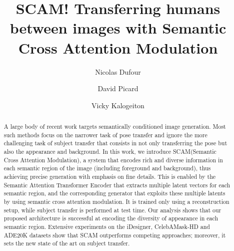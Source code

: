 \documentclass[runningheads]{llncs}
\makeatletter
\newcommand{\mname}{SCAM\@\xspace}
\makeatother
\begin{document}
\pagestyle{headings}
\mainmatter
\def\ECCVSubNumber{575}  

\title{SCAM! Transferring humans between images with Semantic Cross Attention Modulation} 

\begin{comment}
\titlerunning{ECCV-22 submission ID \ECCVSubNumber} 
\authorrunning{ECCV-22 submission ID \ECCVSubNumber} 
\author{Anonymous ECCV submission}
\institute{Paper ID \ECCVSubNumber}
\end{comment}


\author{Nicolas Dufour \and
David Picard \and
Vicky Kalogeiton}
\maketitle

\begin{abstract}
A large body of recent work targets semantically conditioned image generation.  
Most such methods focus on the narrower task of pose transfer and ignore the more challenging task of subject transfer that consists in not only transferring the pose but also the appearance and background. 
In this work, we introduce \mname (Semantic Cross Attention Modulation), a system that encodes rich and diverse information in each semantic region of the image (including foreground and background), thus achieving precise generation with emphasis on fine details. 
This is enabled by the Semantic Attention Transformer Encoder that extracts multiple latent vectors for each semantic region, and the corresponding generator that exploits these multiple latents by using semantic cross attention modulation. 
It is trained only using a reconstruction setup, while subject transfer is performed at test time.
Our analysis shows that our proposed architecture is successful at encoding the diversity of appearance in each semantic region. Extensive experiments on the iDesigner, CelebAMask-HD and ADE20K datasets show that \mname outperforms competing approaches; moreover, it sets the new state of the art on subject transfer.
\end{abstract}
\end{document}
